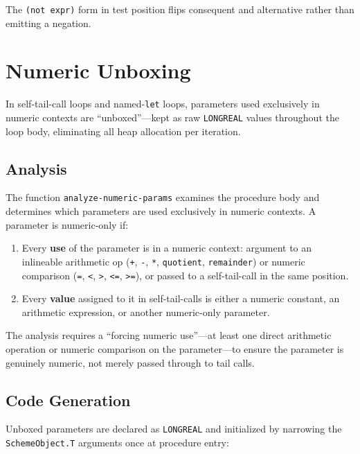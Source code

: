 \documentclass[12pt]{report}
\begin{document}
The \texttt{(not expr)} form in test position flips consequent and
alternative rather than emitting a negation.

\section{Numeric Unboxing}
\label{sec:opt-unboxing}

In self-tail-call loops and named-\texttt{let} loops, parameters
used exclusively in numeric contexts are ``unboxed''---kept as raw
\texttt{LONGREAL} values throughout the loop body, eliminating
all heap allocation per iteration.

\subsection{Analysis}

The function \texttt{analyze-numeric-params} examines the procedure
body and determines which parameters are used exclusively in numeric
contexts.  A parameter is numeric-only if:

\begin{enumerate}
\item Every \textbf{use} of the parameter is in a numeric context:
  argument to an inlineable arithmetic op (\texttt{+}, \texttt{-},
  \texttt{*}, \texttt{quotient}, \texttt{remainder}) or numeric
  comparison (\texttt{=}, \texttt{<}, \texttt{>}, \texttt{<=},
  \texttt{>=}), or passed to a self-tail-call in the same position.

\item Every \textbf{value} assigned to it in self-tail-calls is
  either a numeric constant, an arithmetic expression, or another
  numeric-only parameter.
\end{enumerate}

\noindent
The analysis requires a ``forcing numeric use''---at least one
direct arithmetic operation or numeric comparison on the
parameter---to ensure the parameter is genuinely numeric, not
merely passed through to tail calls.

\subsection{Code Generation}

Unboxed parameters are declared as \texttt{LONGREAL} and
initialized by narrowing the \texttt{SchemeObject.T} arguments
once at procedure entry:
\end{document}

